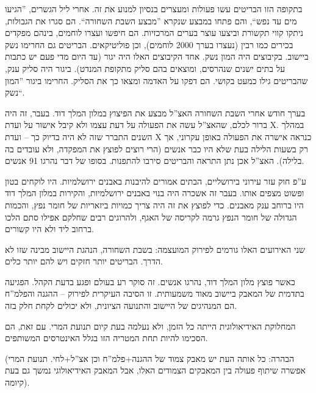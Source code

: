 \documentclass[]{../../../../tex/classes/styledArticle}
\begin{document}
	בתקופה הזו הבריטים עשו פעולות ומעצרים בנסיון למנוע את זה. אחרי ליל הגשרים, ''הגיעו מים עד נפש``, והם פתחו במבצע שנקרא ''מבצע השבת השחורה``. הם סגרו את הגבולות, ניתקו קווי תקשורת וביצעו עוצר בערים המרכזיות. הם חיפשו ועצרו לוחמים, בינהם מפקדים בכירים כמו רבין (נעצרו בערך 2000 לוחמים), וכן פוליטיקאים. הבריטים גם החרימו נשק ביישוב. בקיבוצים היה המון נשק. אחד הקיבוצים האלו היה יגור (עד היום מדי פעם יש כתבות על בתים ישנים שנהרסים, ומוצאים בהם סליק מתקופת המנדט). ביגור היה סליק ענק, שהבריטים גילו כמעט בקושי. הם דפקו על האדמה ומצאו כך את הסליק. החרימו ביגור ''המון נשק``. 
	
	בערך חודש אחרי השבת השחורה האצ''ל מבצע את הפיצוץ במלון המלך דוד. בעבר, זה היה ברור לכלם, שהאצ''ל עשה את הפעולה על דעת עצמו ולא קיבל אישור על ועדת X. במהלך השנים התברר שזה לא היה בדיוק כך – ועדת X כנראה אישרה את הפעולה באופן עקרוני, אך רק בשעות הלילה בעת שלא היו כבר אנשים (הרי רוצים לפוצץ את המפקדה, ולא עובדים בה בלילה). האצ''ל אכן נתן התראה והבריטים סירבו להתפנות. בסופו של דבר נהרגו 91 אנשים. 
	
	ע''פ חוק עזר עירוני בירושליים, הבתים אמורים להיבנות באבנים ירושלמיות. היו לוקחים בטון ופשוט מצפים אותו. בעבר זה אשכרה היה בנוי באבנים ירושלמיות, והקירות במלון המלך דוד היו ברוחב ענק מאבנים. כדי לפוצץ את זה היה צריך כמויות ביזאריות של חומר נפץ, והכמות הגדולה של חומר הנפץ גרמה לקריסה של האגף, ולהרוגים רבים שחלקם אפילו סתם הלכו ברחוב ליד ולא היו קשורים. 
	
	שני האירועים האלו גורמים לפירוק המועצמה: בשבת השחורה, הנהגת היישוב מבינה שזו לא הדרך. הבריטים יותר חזקים ויש להם יותר כלים. 
	
	כאשר פוצץ מלון המלך דוד, נהרגו אנשים. זה סוקר רע בעולם ופגע בדעת הקהל. הפגיעה בתדמית של המאבק ביישוב מאוד משמעותית. זו הסיבה העיקרית לפירוק – ההגנה והפלמ''ח הם המנהיגים של היישוב והתנועה הציונית, ולא יכולים לקחת חלק בזה. 
	
	המחלוקת האידיאולוגית הייתה כל הזמן, ולא נעלמה בעת קיום תנועת המרי. עם זאת, הם הסכימו להיות תחת המטריה הזו בגלל האינטרסים המשותפים. 
	
	(הבהרה: כל אותה העת יש מאבק צמוד של ההגנה+פלמ''ח וכן אצ''ל+לחי. תנועת המרי אפשרה שיתוף פעולה בין המאבקים הצמודים האלו, אבל המאבק האידיאולוגי נמשך גם בעת קיומה). 
	
	
	
	
	\ndoc
\end{document}
